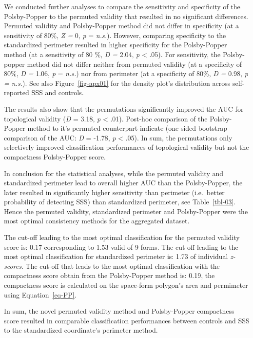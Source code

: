 \documentclass[
  man,
  floatsintext,
  longtable,
  a4paper,
  nolmodern,
  notxfonts,
  notimes,
  colorlinks=true,linkcolor=blue,citecolor=blue,urlcolor=blue]{apa7}
\begin{document}
We conducted further analyses to compare the sensitivity and specificity
of the Polsby-Popper to the permuted validity that resulted in no
significant differences. Permuted validity and Polsby-Popper method did
not differ in specificity (at a sensitivity of 80\%, \emph{Z =} 0,
\emph{p} = \emph{n.s.}). However, comparing specificity to the
standardized perimeter resulted in higher specificity for the
Polsby-Popper method (at a sensitivity of 80 \%, \emph{D =} 2.04,
\emph{p} \textless{} .05). For sensitivity, the Polsby-popper method did
not differ neither from permuted validity (at a specificity of 80\%,
\emph{D =} 1.06, \emph{p} = \emph{n.s.}) nor from perimeter (at a
specificity of 80\%, \emph{D =} 0.98, \emph{p = n.s.}). See also
Figure~\ref{fig-apx01} for the density plot's distribution across
self-reported SSS and controls.

The results also show that the permutations significantly improved the
AUC for topological validity (\emph{D} = 3.18, \emph{p} \textless{}
.01). Post-hoc comparison of the Polsby-Popper method to it's permuted
counterpart indicate (one-sided bootstrap comparison of the AUC:
\emph{D} = -1.78, \emph{p} \textless{} .05). In sum, the permutations
only selectively improved classification performances of topological
validity but not the compactness Polsby-Popper score.

In conclusion for the statistical analyses, while the permuted validity
and standardized perimeter lead to overall higher AUC than the
Polsby-Popper, the later resulted in significantly higher sensitivity
than perimeter (i.e.~better probability of detecting SSS) than
standardized perimeter, see Table~\ref{tbl-03}. Hence the permuted
validity, standardized perimeter and Polsby-Popper were the most optimal
consistency methods for the aggregated dataset.

The cut-off leading to the most optimal classification for the permuted
validity score is: 0.17 corresponding to 1.53 valid of 9 forms. The
cut-off leading to the most optimal classification for standardized
perimeter is: 1.73 of individual \emph{z-scores}. The cut-off that leads
to the most optimal classification with the compactness score obtain
from the Polsby-Popper method is: 0.19, the compactness score is
calculated on the space-form polygon's area and permimeter using
Equation~\ref{eq-PP}.

In sum, the novel permuted validity method and Polsby-Popper compactness
score resulted in comparable classification performances between
controls and SSS to the standardized coordinate's perimeter method.
\end{document}
